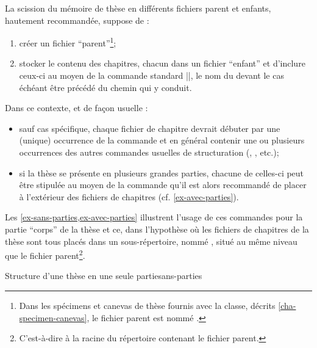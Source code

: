 La scission du mémoire de thèse en différents fichiers parent et enfants,
hautement recommandée, suppose de :
\begin{enumerate}
\item créer un fichier \enquote{parent}\footnote{Dans les spécimens et canevas
    de thèse fournis avec la classe, décrits \vref{cha-specimen-canevas}, le
    fichier parent est nommé .};
\item stocker le contenu des chapitres, chacun dans un fichier
  \enquote{enfant}
  et d'inclure ceux-ci au moyen de la commande
  standard ||, le nom du  devant le cas échéant être précédé du chemin qui y
  conduit.
\end{enumerate}
%
Dans ce contexte, et de façon usuelle :
\begin{itemize}
\item sauf cas spécifique, chaque fichier de chapitre devrait débuter par une
  (unique) occurrence de la commande  et en général
  contenir une ou plusieurs occurrences des autres commandes usuelles de
  structuration (, , etc.);
\item si la thèse se présente en plusieurs grandes parties, chacune
  de celles-ci peut être stipulée au moyen de la commande
   qu'il est alors recommandé de placer à
  l'extérieur des fichiers de chapitres (cf.
  \vref{ex-avec-parties}).
\end{itemize}
%
Les \vref{ex-sans-parties,ex-avec-parties} illustrent l'usage de
ces commandes pour la partie \enquote{corps} de la thèse et ce, dans l'hypothèse
où les fichiers de chapitres de la thèse sont tous placés dans un
sous-répertoire, nommé , situé au même niveau que le fichier
parent\footnote{C'est-à-dire à la racine du répertoire contenant le fichier
  parent.}.
\begin{dbexample}{Structure d'une thèse en une seule partie}{sans-parties}
\begin{bodycode}
"}
"}
...
"}
"}
\end{bodycode}
\end{dbexample}
